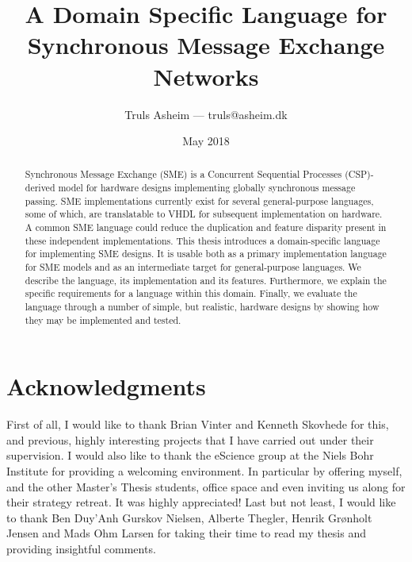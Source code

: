 \documentclass[oneside,a4paper,oldfontcommands]{memoir}
\author{Truls Asheim --- {\ttfamily truls@asheim.dk}}
\title{A Domain Specific Language for Synchronous Message Exchange Networks}
\date{May 2018}
\begin{document}
\frontmatter

\begin{titlingpage}
\maketitle
\end{titlingpage}

\newpage
\begin{abstract}
  Synchronous Message Exchange (SME) is a Concurrent Sequential Processes
  (CSP)-derived model for hardware designs implementing globally synchronous
  message passing. SME implementations currently exist for several
  general-purpose languages, some of which, are translatable to VHDL for
  subsequent implementation on hardware. A common SME language could reduce the
  duplication and feature disparity present in these independent
  implementations. This thesis introduces a domain-specific language for
  implementing SME designs. It is usable both as a primary implementation
  language for SME models and as an intermediate target for general-purpose
  languages. We describe the language, its implementation and its
  features. Furthermore, we explain the specific requirements for a language
  within this domain. Finally, we evaluate the language through a number of
  simple, but realistic, hardware designs by showing how they may be implemented
  and tested.
\end{abstract}
\newpage

\chapter{Acknowledgments}
First of all, I would like to thank Brian Vinter and Kenneth Skovhede for this,
and previous, highly interesting projects that I have carried out under their
supervision. I would also like to thank the eScience group at the Niels Bohr
Institute for providing a welcoming environment. In particular by offering
myself, and the other Master's Thesis students, office space and even inviting
us along for their strategy retreat. It was highly appreciated! Last but not
least, I would like to thank Ben Duy'Anh Gurskov Nielsen, Alberte Thegler,
Henrik Grønholt Jensen and Mads Ohm Larsen for taking their time to read my
thesis and providing insightful comments.

\newpage
\tableofcontents

\printglossary[type=\acronymtype,title=Abbrevations]

\end{document}
